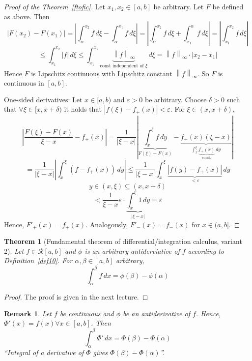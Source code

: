 \documentclass{article}
\newtheorem{theorem}{Theorem}  \numberwithin{theorem}{section}
\newtheorem{remark}{Remark}  \numberwithin{remark}{section}
\newcommand{\norm}[1]{\left\|#1\right\|}
\newcommand{\card}[1]{\left|#1\right|}
\begin{document}
\begin{proof}[Proof of the Theorem~\ref{ftofic}]
  Let $x_1, x_2 \in [a,b]$ be arbitrary. Let $F$ be defined as above. Then
  \[ \card{F(x_2) - F(x_1)} = \card{\int_\alpha^{x_2} f \, d\xi - \int_\alpha^{x_1} f \, d\xi}
     = \card{\int_\alpha^{x_2} f \, d\xi + \int_{x_1}^\alpha f \, d\xi} = \card{\int_{x_1}^{x_2} f \, d\xi} \]
  \[ \leq \int_{x_1}^{x_2} \card{f} \, d\xi \leq \int_{x_1}^{x_2} \underbrace{\norm{f}_{\infty}}_{\text{const independent of } \xi} \, d\xi  = \norm{f}_{\infty} \cdot \card{x_2 - x_1} \]
  Hence $F$ is Lipschitz continuous with Lipschitz constant $\norm{f}_{\infty}$. So $F$ is continuous in $[a,b]$.

  One-sided derivatives: Let $x \in [a,b)$ and $\varepsilon > 0$ be arbitrary.
  Choose $\delta > 0$ such that $\forall \xi \in [x, x+\delta)$ it holds that $\card{f(\xi) - f_+(x)} < \varepsilon$.
  For $\xi \in (x, x+\delta)$,
  \[ \card{\frac{F(\xi) - F(x)}{\xi - x} - f_+(x)} = \frac1{\card{\xi - x}} \card{\underbrace{\int_x^\xi f \, dy}_{F(\xi) - F(x)} - \underbrace{f_+(x)(\xi - x)}_{\int_x^\xi \underbrace{f_+(x)}_{\text{const.}} \, dy}} \]
  \[ = \frac{1}{\card{\xi - x}} \card{\int_x^\xi (f - f_+(x)) \, dy} \leq \frac{1}{\card{\xi - x}} \int_x^\xi \underbrace{\card{f(y) - f_+(x)}}_{< \varepsilon} \, dy \]
  \[ y \in (x, \xi) \subseteq (x, x+\delta) \]
  \[ < \frac{1}{\xi - x} \varepsilon \cdot \underbrace{\int_x^\xi 1 \, dy}_{\card{\xi - x}} = \varepsilon \]
  Hence, $F'_+(x) = f_+(x)$.
  Analogously, $F'_-(x) = f_-(x)$ for $x \in (a,b]$.
\end{proof}

\begin{theorem}[Fundamental theorem of differential/integration calculus, variant 2] %
  \label{satz5}
  Let $f \in \mathcal R[a,b]$ and $\phi$ is an arbitrary antiderviative of $f$ according to Definition~\ref{def10}.
  For $\alpha, \beta \in [a,b]$ arbitrary,
  \[ \int_\alpha^\beta f \, dx = \phi(\beta) - \phi(\alpha) \]
\end{theorem}

\begin{proof}
  The proof is given in the next lecture.
\end{proof}

\begin{remark} %
  Let $f$ be continuous and $\phi$ be an antiderivative of $f$.
  Hence, $\Phi'(x) = f(x) \forall x \in [a,b]$.
  Then
  \[ \int_{\alpha}^{\beta} \Phi' \, dx = \Phi(\beta) - \Phi(\alpha) \]
  \enquote{Integral of a derivative of $\Phi$ gives $\Phi(\beta) - \Phi(\alpha)$}.
\end{remark}
\end{document}
